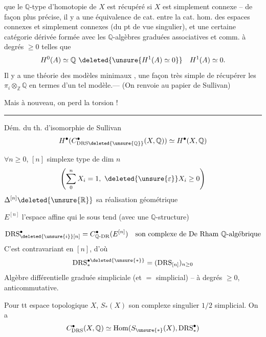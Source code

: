 que le $\mathbb Q$-type d'homotopie de $X$ est récupéré si $X$ est simplement connexe -- de façon plus précise, il y a  une équivalence de cat.  entre la cat. hom.  des espaces connexes et simplement connexes (du pt de vue singulier), et une certaine catégorie dérivée formée avec les $\mathbb Q$-algèbres graduées associatives et comm.  à degrés $\geq 0$ telles que
\[
H^0(A)\simeq\mathbb Q\ \deleted{\unsure{H^1(A)\simeq 0}}\quad H^1(A)\simeq 0 .
\]
Il y a une théorie des modèles minimaux , une façon très simple de récupérer les $\pi_i\otimes_{\mathbb Z}\mathbb Q$ en termes d'un tel modèle.--- (On renvoie au papier de Sullivan)

Mais à nouveau, on perd la torsion !

\noindent\rule{\linewidth}{0.3pt}

Dém. du th. d'isomorphie de Sullivan
\[
H^\bullet(C^\bullet_{\mathrm{DRS}\deleted{\unsure{\mathbb Q}}}(X,\mathbb Q))\simeq H^\bullet(X,\mathbb Q)
\]

$\forall n\geq 0$, $[n]$ simplexe type de dim $n$
\[
\left(\sum_0^n X_i=1,\ \deleted{\unsure{\varepsilon}}X_i\geq 0\right)
\]
$\Delta^{[n]}\deleted{\unsure{\mathbb R}}$ sa réalisation géométrique

$E^{[n]}$ l'espace affine qui le sous tend (avec une $\mathbb Q$-structure)

\[
\mathrm{DRS}^{\bullet}_{\deleted{\unsure{i}}[n]}=C^\bullet_{\mathbb Q\text{-}\mathrm{DR}}(E^{[n]})\quad\text{son complexe de De Rham $\mathbb Q$-algébrique}
\]
C'est contravariant en $[n]$, d'où
\[
\mathrm{DRS}^{\bullet\deleted{\unsure{\ast}}}_{\ast}=(\mathrm{DRS}_{[n]})_{n\geq 0}
\]
Algèbre différentielle graduée simpliciale (et $=$ simplicial) -- à degrés $\geq 0$, anticommutative.

Pour tt espace topologique $X$, $S_{\ast}(X)$ son complexe singulier $1/2$ simplicial. On a
\[
C^\bullet_{\mathrm{DRS}}(X,\mathbb Q)\simeq\mathrm{Hom}(S_{\unsure{\ast}}(X),\mathrm{DRS}^{\bullet}_{\ast})
\]

